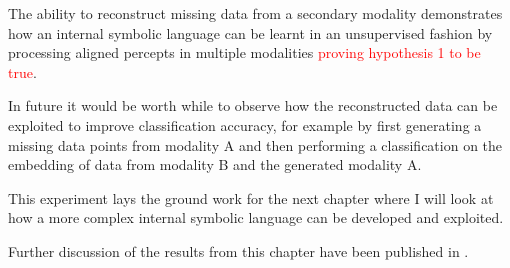 The ability to reconstruct missing data from a secondary modality demonstrates how an internal symbolic language can be learnt in an unsupervised fashion by processing aligned percepts in multiple modalities \textcolor{red}{proving hypothesis 1 to be true}.

In future it would be worth while to observe how the reconstructed data can be exploited to improve classification accuracy, for example by first generating a missing data points from modality A and then performing a classification on the embedding of data from modality B and the generated modality A.

This experiment lays the ground work for the next chapter where I will look at how a more complex internal symbolic language can be developed and exploited.

Further discussion of the results from this chapter have been published in \cite{sheppardtowards}. 
\theendnotes